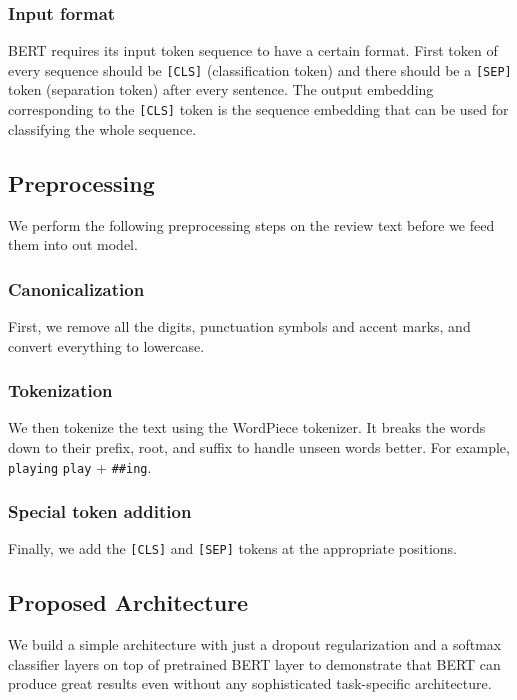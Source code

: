 \documentclass[conference]{IEEEtran}
\begin{document}
\subsubsection{Input format}

BERT requires its input token sequence to have a certain format. First token of every sequence should be {\tt [CLS]} (classification token) and there should be a {\tt [SEP]} token (separation token) after every sentence. The output embedding corresponding to the {\tt [CLS]} token is the sequence embedding that can be used for classifying the whole sequence.

\subsection{Preprocessing}

We perform the following preprocessing steps on the review text before we feed them into out model.

\subsubsection{Canonicalization} First, we remove all the digits, punctuation symbols and accent marks, and convert everything to lowercase.

\subsubsection{Tokenization} We then tokenize the text using the WordPiece tokenizer\cite{wordpiece}. It breaks the words down to their prefix, root, and suffix to handle unseen words better. For example, {\tt playing}  {\tt play} + {\tt \#\#ing}.

\subsubsection{Special token addition} Finally, we add the {\tt [CLS]} and {\tt [SEP]} tokens at the appropriate positions.

\subsection{Proposed Architecture}

We build a simple architecture with just a dropout regularization\cite{dropout} and a softmax classifier layers on top of pretrained BERT layer to demonstrate that BERT can produce great results even without any sophisticated task-specific architecture.
\end{document}
